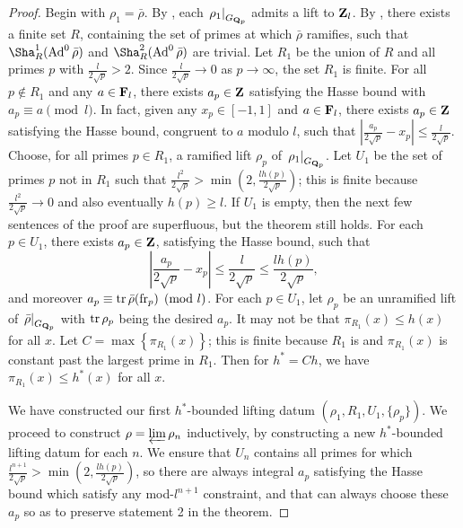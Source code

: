 \begin{proof}
Begin with $\rho_1= \bar\rho$. By \cite[Th.~1]{ramakrishna-2002}, each 
$\left.\rho_1\right|_{G_{\mathbf{Q}_p}}$ admits a lift to $\mathbf{Z}_l$. 
By \cite[Lem.~6]{khare-larsen-ramakrishna-2005}, 
there exists a finite set $R$, containing the set of primes at which $\bar\rho$ 
ramifies, such that $\Sha_R^1(\Ad^0\bar\rho)$ and $\Sha_R^2(\Ad^0\bar\rho)$ are 
trivial. 
Let $R_1$ be the union of $R$ and all primes $p$ with 
$\frac{l}{2\sqrt p} > 2$. Since $\frac{l}{2\sqrt p} \to 0$ as $p\to \infty$, 
the set $R_1$ is finite. For all $p\notin R_1$ and any $a\in \mathbf{F}_l$, there 
exists $a_p\in \mathbf{Z}$ satisfying the Hasse bound with $a_p\equiv a\pmod l$. In 
fact, given any $x_p\in [-1,1]$ and $a\in \mathbf{F}_l$, there exists $a_p\in \mathbf{Z}$ 
satisfying the Hasse bound, congruent to $a$ modulo $l$, such that 
$\left| \frac{a_p}{2\sqrt p} - x_p\right| \leqslant \frac{l}{2\sqrt p}$.
Choose, for all primes $p\in R_1$, a ramified 
lift $\rho_p$ of $\left. \rho_1\right|_{G_{\mathbf{Q}_p}}$. Let $U_1$ be the set of 
primes $p$ not in $R_1$ such that 
$\frac{l^2}{2\sqrt p} > \min\left(2, \frac{l h(p)}{2\sqrt p}\right)$; this is 
finite because $\frac{l^2}{2\sqrt p} \to 0$ and also eventually 
$h(p) \geqslant l$. If $U_1$ is empty, then the next few sentences of the 
proof are superfluous, but the theorem still holds. 
For each $p\in U_1$, there exists $a_p\in \mathbf{Z}$, satisfying the 
Hasse bound, such that 
\[
	\left| \frac{a_p}{2\sqrt p} - x_p\right| \leqslant \frac{l}{2\sqrt p} \leqslant \frac{l h(p)}{2\sqrt p} ,
\]
and moreover $a_p\equiv \operatorname{tr}\bar\rho(\mathrm{fr}_p)\pmod l$. For each $p\in U_1$, let 
$\rho_p$ be an unramified lift of $\left.\bar\rho\right|_{G_{\mathbf{Q}_p}}$ with 
$\operatorname{tr}\rho_p$ being the desired $a_p$. It may not be that 
$\pi_{R_1}(x) \leqslant h(x)$ for all $x$. Let 
$C = \max\left\{\pi_{R_1}(x)\right\}$; this is finite because 
$R_1$ is and $\pi_{R_1}(x)$ is constant past the largest prime in $R_1$. Then 
for $h^\ast = C h$, we have $\pi_{R_1}(x) \leqslant h^\ast(x)$ for all $x$. 

We have constructed our first $h^\ast$-bounded lifting datum 
$(\rho_1,R_1,U_1,\{\rho_p\})$. We proceed to construct 
$\rho = \varprojlim \rho_n$ inductively, by constructing a new $h^\ast$-bounded 
lifting datum for each $n$. We ensure that $U_n$ contains all primes for which 
$\frac{l^{n+1}}{2\sqrt p} > \min\left(2, \frac{l h(p)}{2\sqrt p}\right)$, so 
there are always integral $a_p$ satisfying the Hasse bound which satisfy any 
mod-$l^{n+1}$ constraint, and that can always choose these $a_p$ so as to 
preserve statement 2 in the theorem. 


\end{proof}
